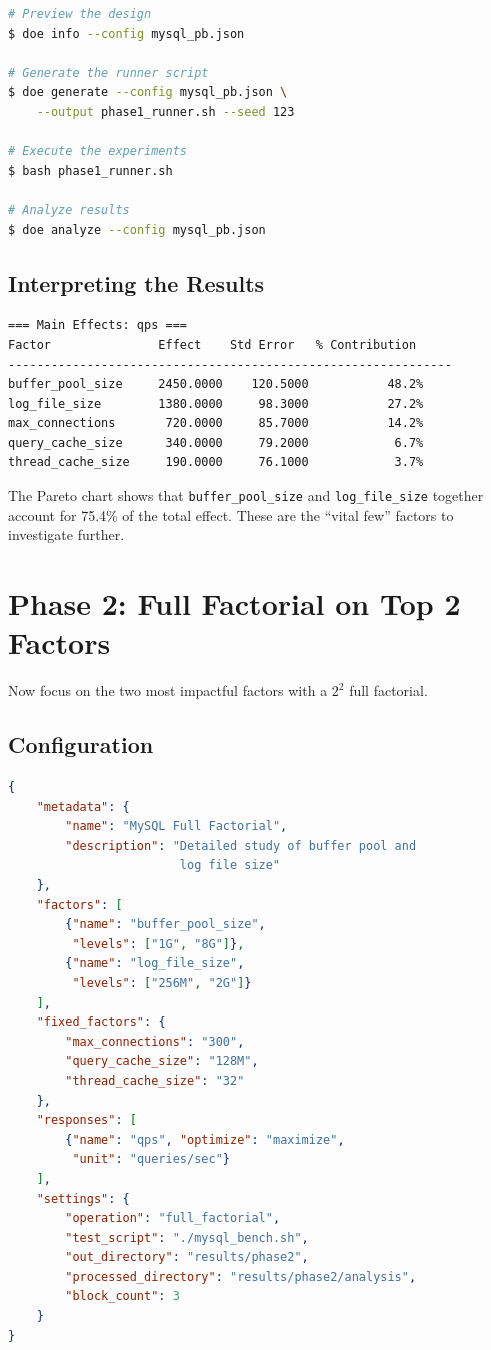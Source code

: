 \documentclass[11pt]{book}
\begin{document}
\begin{lstlisting}[language=bash]
# Preview the design
$ doe info --config mysql_pb.json

# Generate the runner script
$ doe generate --config mysql_pb.json \
    --output phase1_runner.sh --seed 123

# Execute the experiments
$ bash phase1_runner.sh

# Analyze results
$ doe analyze --config mysql_pb.json
\end{lstlisting}

\subsection{Interpreting the Results}

\begin{lstlisting}[language=bash]
=== Main Effects: qps ===
Factor               Effect    Std Error   % Contribution
--------------------------------------------------------------
buffer_pool_size     2450.0000    120.5000           48.2%
log_file_size        1380.0000     98.3000           27.2%
max_connections       720.0000     85.7000           14.2%
query_cache_size      340.0000     79.2000            6.7%
thread_cache_size     190.0000     76.1000            3.7%
\end{lstlisting}

The Pareto chart shows that \texttt{buffer\_pool\_size} and \texttt{log\_file\_size} together account for 75.4\% of the total effect. These are the ``vital few'' factors to investigate further.

\section{Phase 2: Full Factorial on Top 2 Factors}

Now focus on the two most impactful factors with a $2^2$ full factorial.

\subsection{Configuration}

\begin{lstlisting}[language=json]
{
    "metadata": {
        "name": "MySQL Full Factorial",
        "description": "Detailed study of buffer pool and
                        log file size"
    },
    "factors": [
        {"name": "buffer_pool_size",
         "levels": ["1G", "8G"]},
        {"name": "log_file_size",
         "levels": ["256M", "2G"]}
    ],
    "fixed_factors": {
        "max_connections": "300",
        "query_cache_size": "128M",
        "thread_cache_size": "32"
    },
    "responses": [
        {"name": "qps", "optimize": "maximize",
         "unit": "queries/sec"}
    ],
    "settings": {
        "operation": "full_factorial",
        "test_script": "./mysql_bench.sh",
        "out_directory": "results/phase2",
        "processed_directory": "results/phase2/analysis",
        "block_count": 3
    }
}
\end{lstlisting}
\end{document}
